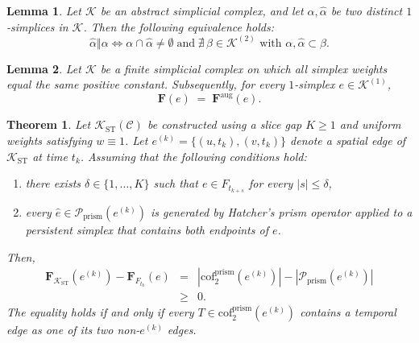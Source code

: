 \documentclass[10pt,a4paper]{amsart}
\newtheorem{lemma}{Lemma}
\newtheorem{theorem}{Theorem}
\newcommand{\F}{\mathbf{F}}        %
\newcommand{\Faug}{\F^{\mathrm{aug}}}
\newcommand{\K}{\mathcal{K}}
\begin{document}
\begin{lemma}\label{lem:reduction}
Let $\K$ be an abstract simplicial complex, and let $\alpha,\hat\alpha$ be two distinct $1$-simplices in $\K$.
Then the following equivalence holds:
\begin{equation*}
    \hat\alpha\Vert\alpha
    \iff
    \alpha\cap\hat\alpha\neq\emptyset
    \;\text{and}\;
    \nexists\, \beta\in\K^{(2)}\text{ with }\alpha,\hat\alpha\subset\beta.
\end{equation*}
\end{lemma}

\begin{lemma}\label{lem:agreement}
Let $\K$ be a finite simplicial complex on which all simplex weights equal the same positive constant.
Subsequently, for every $1$-simplex $e\in\K^{(1)}$,
\begin{equation*}
    \F(e) \;=\; \Faug(e).
\end{equation*}
\end{lemma}

\begin{theorem}\label{prop:monotonicity}
Let $\K_{\mathrm{ST}}(\mathcal{C})$ be constructed using a slice gap $K \ge 1$ and uniform weights satisfying $w \equiv 1$.
Let $e^{(k)} = \{(u, t_k), (v, t_k)\}$ denote a spatial edge of $\K_{\mathrm{ST}}$ at time $t_k$.
Assuming that the following conditions hold:
\begin{enumerate}
\item[\textnormal{(A1)}] there exists $\delta \in \{1, \ldots, K\}$ such that $e \in F_{t_{k+s}}$ for every $|s| \le \delta$,
\item[\textnormal{(A2)}] every $\hat e \in \mathcal{P}_{\mathrm{prism}}(e^{(k)})$ is generated by Hatcher's prism operator applied to a persistent simplex that contains both endpoints of $e$.
\end{enumerate}
Then,
\begin{eqnarray}\label{eq:monotonicity_main}
\F_{\K_{\mathrm{ST}}}(e^{(k)}) - \F_{F_{t_k}}(e)
&=& |\mathrm{cof}_2^{\mathrm{prism}}(e^{(k)})| - |\mathcal{P}_{\mathrm{prism}}(e^{(k)})|\nonumber\\
&\ge& 0.
\end{eqnarray}
The equality holds if and only if every $T \in \mathrm{cof}_2^{\mathrm{prism}}(e^{(k)})$ contains a temporal edge as one of its two non-$e^{(k)}$ edges.
\end{theorem}
\end{document}
